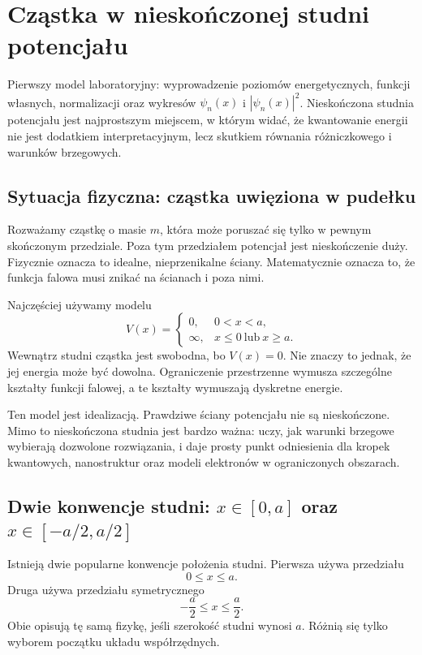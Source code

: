 \chapter{Cząstka w nieskończonej studni potencjału}

\begin{summarybox}
Pierwszy model laboratoryjny: wyprowadzenie poziomów energetycznych, funkcji
własnych, normalizacji oraz wykresów \(\psi_n(x)\) i \(|\psi_n(x)|^2\).
Nieskończona studnia potencjału jest najprostszym miejscem, w którym widać,
że kwantowanie energii nie jest dodatkiem interpretacyjnym, lecz skutkiem
równania różniczkowego i warunków brzegowych.
\end{summarybox}

\section{Sytuacja fizyczna: cząstka uwięziona w pudełku}

Rozważamy cząstkę o masie \(m\), która może poruszać się tylko w pewnym skończonym przedziale. Poza tym przedziałem potencjał jest nieskończenie duży. Fizycznie oznacza to idealne, nieprzenikalne ściany. Matematycznie oznacza to, że funkcja falowa musi znikać na ścianach i poza nimi.

Najczęściej używamy modelu
\[
V(x)=
\begin{cases}
0, & 0<x<a,\\
\infty, & x\leq 0\ \text{lub}\ x\geq a.
\end{cases}
\]
Wewnątrz studni cząstka jest swobodna, bo \(V(x)=0\). Nie znaczy to jednak, że jej energia może być dowolna. Ograniczenie przestrzenne wymusza szczególne kształty funkcji falowej, a te kształty wymuszają dyskretne energie.

Ten model jest idealizacją. Prawdziwe ściany potencjału nie są nieskończone. Mimo to nieskończona studnia jest bardzo ważna: uczy, jak warunki brzegowe wybierają dozwolone rozwiązania, i daje prosty punkt odniesienia dla kropek kwantowych, nanostruktur oraz modeli elektronów w ograniczonych obszarach.

\section{Dwie konwencje studni: \texorpdfstring{\(x\in[0,a]\)}{x in [0,a]} oraz \texorpdfstring{\(x\in[-a/2,a/2]\)}{x in [-a/2,a/2]}}

Istnieją dwie popularne konwencje położenia studni. Pierwsza używa przedziału
\[
0\leq x\leq a.
\]
Druga używa przedziału symetrycznego
\[
-\frac{a}{2}\leq x\leq \frac{a}{2}.
\]
Obie opisują tę samą fizykę, jeśli szerokość studni wynosi \(a\). Różnią się tylko wyborem początku układu współrzędnych.

